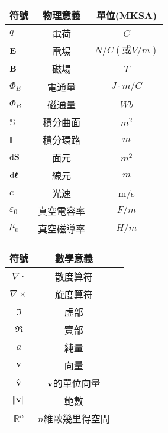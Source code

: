 \begin{table}[!htbp]
    \centering
    \begin{tabular}{lcc}
        \toprule
        符號                     & 物理意義   & 單位(MKSA)                 \\
        \midrule
        $q$                      & 電荷       & $\unit{C}$                 \\
        $\mathbf{E}$                 & 電場       & $\unit{N/C(\text{或}V/m)}$ \\
        $\mathbf{B}$                 & 磁場       & $\unit{T}$                 \\
        $\Phi_E$                 & 電通量     & $\unit{J\cdot m /C}$       \\
        $\Phi_B$                 & 磁通量     & $\unit{Wb}$                \\
        $\mathbb{S}$             & 積分曲面   & $\unit{m^2}$               \\
        $\mathbb{L}$             & 積分環路   & $\unit{m}$                 \\
        $\mathop{}\!\mathrm{d} \mathbf{S}$            & 面元       & $\unit{m^2}$               \\
        $\mathop{}\!\mathrm{d} \boldsymbol{\ell}$ & 線元       & $\unit{m}$                 \\
        $c$                      & 光速       & m/s                        \\
        $\varepsilon_0$          & 真空電容率 & $\unit{F/m}$               \\
        $\mu_0$                  & 真空磁導率 & $\unit{H/m}$               \\
        \bottomrule
    \end{tabular}
\end{table}

\begin{table}[!htbp]
    \centering
    \begin{tabular}{ccc}
        \toprule
        符號            & 數學意義           \\
        \midrule
        $\nabla \cdot$  & 散度算符           \\
        $\nabla \times$ & 旋度算符           \\
        $\Im$           & 虛部               \\
        $\Re$           & 實部               \\
        $a$             & 純量               \\
        $\mathbf{v}$        & 向量               \\
        $\hat{\mathbf{v}}$        & $\mathbf{v}$的單位向量 \\
        $\left\|\mathbf{v}\right\|$ & 範數               \\
        $\mathbb{R}^n$  & $n$維歐幾里得空間  \\
        \bottomrule
    \end{tabular}
\end{table}
